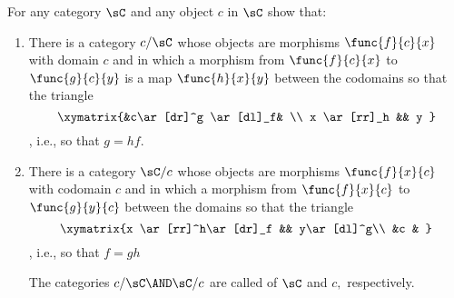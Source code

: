 \documentclass[main.tex]{subfiles}
\begin{document}
\begin{exercise}
For any category \(\sC\) and any object \(c\) in \(\sC\) show that:
\begin{enumerate}
	\item There is a category \(c/\sC\) whose objects are morphisms
		\(\func{f}{c}{x}\) with domain \(c\) and in which a morphism from
		\(\func{f}{c}{x}\) to \(\func{g}{c}{y}\) is a map \(\func{h}{x}{y}\)
		between the codomains so that the triangle \[ \xymatrix{&c\ar[dr]^g
		\ar[dl]_f& \\ x \ar[rr]_h && y } \] , i.e., so that
		\(g=hf.\)

	\item There is a category \(\sC/c\) whose objects are morphisms
		\(\func{f}{x}{c}\) with codomain \(c\) and in which a morphism from
		\(\func{f}{x}{c}\) to \( \func{g}{y}{c} \) between the domains so that
		the triangle \[ \xymatrix{x \ar[rr]^h\ar[dr]_f && y\ar[dl]^g\\ &c & } \]
		, i.e., so that \(f=gh\)

		The categories \(c/\sC\AND\sC/c\) are called  of
		\(\sC\)  and  \(c,\) respectively.
\end{enumerate}
\end{exercise}
\end{document}
